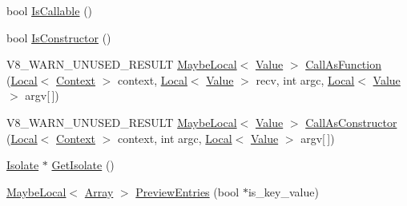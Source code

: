 \begin{DoxyCompactItemize}
bool \mbox{\hyperlink{classv8_1_1Object_a23c2c1f23b50fab4a02e2f819641b865}{Is\+Callable}} ()
\item 
bool \mbox{\hyperlink{classv8_1_1Object_a257233cb6b11dc7bb5a0e8df8695e889}{Is\+Constructor}} ()
\item 
V8\+\_\+\+W\+A\+R\+N\+\_\+\+U\+N\+U\+S\+E\+D\+\_\+\+R\+E\+S\+U\+LT \mbox{\hyperlink{classv8_1_1MaybeLocal}{Maybe\+Local}}$<$ \mbox{\hyperlink{classv8_1_1Value}{Value}} $>$ \mbox{\hyperlink{classv8_1_1Object_aec7375fe34a800baac4e26deb33ccac0}{Call\+As\+Function}} (\mbox{\hyperlink{classv8_1_1Local}{Local}}$<$ \mbox{\hyperlink{classv8_1_1Context}{Context}} $>$ context, \mbox{\hyperlink{classv8_1_1Local}{Local}}$<$ \mbox{\hyperlink{classv8_1_1Value}{Value}} $>$ recv, int argc, \mbox{\hyperlink{classv8_1_1Local}{Local}}$<$ \mbox{\hyperlink{classv8_1_1Value}{Value}} $>$ argv\mbox{[}$\,$\mbox{]})
\item 
V8\+\_\+\+W\+A\+R\+N\+\_\+\+U\+N\+U\+S\+E\+D\+\_\+\+R\+E\+S\+U\+LT \mbox{\hyperlink{classv8_1_1MaybeLocal}{Maybe\+Local}}$<$ \mbox{\hyperlink{classv8_1_1Value}{Value}} $>$ \mbox{\hyperlink{classv8_1_1Object_a10dcefb0bd595a959234703690a02530}{Call\+As\+Constructor}} (\mbox{\hyperlink{classv8_1_1Local}{Local}}$<$ \mbox{\hyperlink{classv8_1_1Context}{Context}} $>$ context, int argc, \mbox{\hyperlink{classv8_1_1Local}{Local}}$<$ \mbox{\hyperlink{classv8_1_1Value}{Value}} $>$ argv\mbox{[}$\,$\mbox{]})
\item 
\mbox{\hyperlink{classv8_1_1Isolate}{Isolate}} $\ast$ \mbox{\hyperlink{classv8_1_1Object_ab991b53d50ab3ce53179e927e52b24f5}{Get\+Isolate}} ()
\item 
\mbox{\hyperlink{classv8_1_1MaybeLocal}{Maybe\+Local}}$<$ \mbox{\hyperlink{classv8_1_1Array}{Array}} $>$ \mbox{\hyperlink{classv8_1_1Object_a6705d705f6ddb941100a46875609c63a}{Preview\+Entries}} (bool $\ast$is\+\_\+key\+\_\+value)
\end{DoxyCompactItemize}

